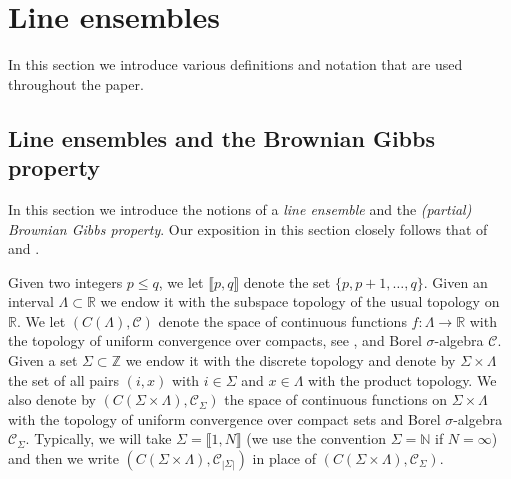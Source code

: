 %
\section{Line ensembles}\label{Section2}
In this section we introduce various definitions and notation that are used throughout the paper. 

%
\subsection{Line ensembles and the Brownian Gibbs property}\label{Section2.1}
In this section we introduce the notions of a {\em line ensemble} and the {\em (partial) Brownian Gibbs property}. Our exposition in this section closely follows that of \cite[Section 2]{DimMat} and \cite[Section 2]{CorHamA}. 

Given two integers $p \leq q$, we let $\llbracket p, q \rrbracket$ denote the set $\{p, p+1, \dots, q\}$. Given an interval $\Lambda \subset \mathbb{R}$ we endow it with the subspace topology of the usual topology on $\mathbb{R}$. We let $(C(\Lambda), \mathcal{C})$ denote the space of continuous functions $f: \Lambda \rightarrow \mathbb{R}$ with the topology of uniform convergence over compacts, see \cite[Chapter 7, Section 46]{Munkres}, and Borel $\sigma$-algebra $\mathcal{C}$. Given a set $\Sigma \subset \mathbb{Z}$ we endow it with the discrete topology and denote by $\Sigma \times \Lambda$ the set of all pairs $(i,x)$ with $i \in \Sigma$ and $x \in \Lambda$ with the product topology. We also denote by $\left(C (\Sigma \times \Lambda), \mathcal{C}_{\Sigma}\right)$ the space of continuous functions on $\Sigma \times \Lambda$ with the topology of uniform convergence over compact sets and Borel $\sigma$-algebra $\mathcal{C}_{\Sigma}$. Typically, we will take $\Sigma = \llbracket 1, N \rrbracket$ (we use the convention $\Sigma = \mathbb{N}$ if $N = \infty$) and then we write  $\left(C (\Sigma \times \Lambda), \mathcal{C}_{|\Sigma|}\right)$ in place of $\left(C (\Sigma \times \Lambda), \mathcal{C}_{\Sigma}\right)$.




